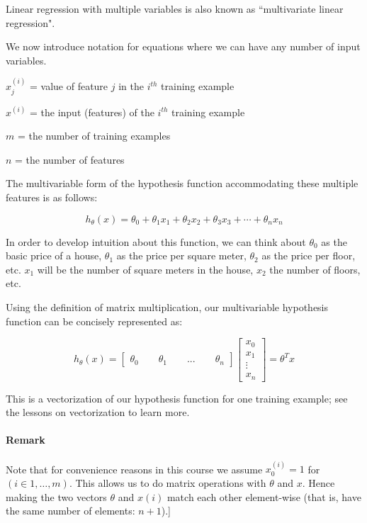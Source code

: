 \documentclass[UTF8]{article}
\begin{document}
Linear regression with multiple variables is also known as ``multivariate linear regression".

We now introduce notation for equations where we can have any number of input variables.

$x_j^{(i)}$ = value of feature $j$ in the $i^{th}$ training example

$x^{(i)}$ = the input (features) of the $i^{th}$ training example

$m$ = the number of training examples

$n$ = the number of features

The multivariable form of the hypothesis function accommodating these multiple features is as follows:

\[ h_\theta (x) = \theta_0 + \theta_1 x_1 + \theta_2 x_2 + \theta_3 x_3 + \cdots + \theta_n x_n \]

In order to develop intuition about this function, we can think about $\theta_0$ as the basic price of a house, $\theta_1$ as the price per square meter, $\theta_2$ as the price per floor, etc. $x_1$ will be the number of square meters in the house, $x_2$ the number of floors, etc.

Using the definition of matrix multiplication, our multivariable hypothesis function can be concisely represented as:

\[ h_\theta(x) = \begin{bmatrix}\theta_0 \hspace{2em} \theta_1 \hspace{2em} ... \hspace{2em} \theta_n\end{bmatrix}\begin{bmatrix}x_0 \\ x_1 \\ \vdots \\ x_n\end{bmatrix}= \theta^T x \]

This is a vectorization of our hypothesis function for one training example; see the lessons on vectorization to learn more.

\paragraph{Remark} Note that for convenience reasons in this course we assume $x_{0}^{(i)} =1$ for $(i\in { 1,\dots,m })$. This allows us to do matrix operations with $\theta$ and $x$. Hence making the two vectors $\theta$ and $x(i)$ match each other element-wise (that is, have the same number of elements: $n+1$).]
\end{document}
